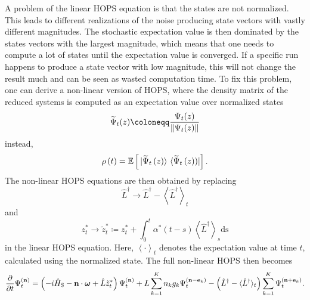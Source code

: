 A problem of the linear HOPS equation is that the states are not normalized. This leads to different realizations of the noise
producing state vectors with vastly different magnitudes. The stochastic expectation value is then dominated by the states vectors
with the largest magnitude, which means that one needs to compute a lot of states until the expectation value is converged.
If a specific run happens to produce a state vector with low magnitude, this will not change the result much and can be seen
as wasted computation time. To fix this problem, one can derive a non-linear version of HOPS, where the density matrix of the
reduced systems is computed as an expectation value over normalized states
\begin{equation*}
    \widetilde{\Psi}_t(z) \coloneqq \frac{\Psi_t(z)}{\norm{\Psi_t(z)}}
\end{equation*}
instead,
\begin{equation}
    \label{eq:averaging_states_nonlinear}
    \rho\left(t\right) = \mathbb{E}\left[\ket*{\widetilde{\Psi}_t\left(z\right)}\bra*{\widetilde{\Psi}_t\left(z)\right)}\right].
\end{equation}
 The non-linear HOPS equations are then obtained by replacing \cite{Diosi:1998}
\begin{equation*}
    \hat{L}^\dagger \rightarrow \hat{L}^\dagger - \left\langle
        \hat{L}^\dagger
    \right\rangle_t
\end{equation*}
and
\begin{equation}
    \label{eq:memory_term_nonlinear_HOPS}
    z_t^* \rightarrow \tilde{z}_t^* \coloneqq z_t^* + \int_0^t \alpha^*(t-s) \left\langle
        \hat{L}^\dagger
    \right\rangle_s \text{ds}
\end{equation}
in the linear HOPS equation. Here, $\left\langle \cdot \right\rangle_t$ denotes the expectation value at time $t$, calculated using the normalized state.
The full non-linear HOPS then becomes
\begin{equation}
    \label{eq:non_linear_HOPS_single_site}
    \frac{\partial}{\partial t}\Psi_t^{(\vectorbold{n})} = \left(
        -i\hat{H}_\text{S} - \vectorbold{n}\cdot\boldsymbol{\omega} + \hat{L}\tilde{z}_t^*
    \right) \Psi_t^{(\vectorbold{n})}
    + L\sum_{k=1}^{K}n_kg_k\Psi_t^{(\vectorbold{n}-\vectorbold{e}_k)}
    - \left(
        \hat{L}^\dagger - \langle
        \hat{L}^\dagger
    \rangle_t
    \right)\sum_{k=1}^{K}\Psi_t^{(\vectorbold{n}+\vectorbold{e}_k)}.
\end{equation}